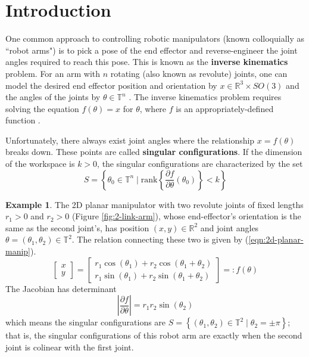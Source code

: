 \documentclass[12pt]{article}
\theoremstyle{definition}
\newtheorem{example}{Example}
\begin{document}
    
\section{Introduction}
One common approach to controlling robotic manipulators 
(known colloquially as ``robot arms") is to pick a pose of the end effector and
reverse-engineer the joint angles required to reach this pose. This is known as
the \textbf{inverse kinematics} problem. For an arm with \(n\) rotating 
(also known as revolute) joints, one can model the desired end effector position
and orientation by \(x \in \mathbb{R}^3 \times SO(3)\) and the angles of the
joints by \(\theta \in \mathbb{T}^n\) \cite{robots-fiber-bundles}. 
The inverse kinematics problem requires solving the
equation \(f(\theta) = x\) for \(\theta\), where \(f\) is an 
appropriately-defined function \cite{program-kin-red-manips}.

Unfortunately, there always exist joint angles where the relationship 
\(x = f(\theta)\) breaks down. These points are called 
\textbf{singular configurations}. If the dimension of the workspace is 
\(k > 0\), the singular configurations are characterized by the set
\[
    S = \left\{ \theta_0 \in \mathbb{T}^n \mid 
    \text{rank}\left\{
        \frac{\partial f}{\partial\theta}(\theta_0) 
    \right\} < k \right\}
\]

\begin{example}
    The 2D planar manipulator with two revolute joints of fixed lengths \(r_1 > 0\)
    and \(r_2 > 0\) (Figure \ref{fig:2-link-arm}), whose end-effector's orientation is the same
    as the second joint's, has position \((x,y) \in \mathbb{R}^2\) and joint angles 
    \(\theta = (\theta_1,\theta_2) \in \mathbb{T}^2\). 
    The relation connecting these two is given by (\ref{eqn:2d-planar-manip}).
    \begin{equation}\label{eqn:2d-planar-manip}
        \begin{bmatrix}x \\ y \end{bmatrix}
        = \begin{bmatrix} 
            r_1\cos(\theta_1) + r_2\cos(\theta_1 + \theta_2) \\
            r_1\sin(\theta_1) + r_2\sin(\theta_1 + \theta_2)
        \end{bmatrix} =: f(\theta)
    \end{equation}
    The Jacobian has determinant
    \[
        \left| \frac{\partial f}{\partial \theta} \right| = r_1r_2\sin(\theta_2)
    \]
    which means the singular configurations are 
    \(S = \left\{ (\theta_1,\theta_2) \in \mathbb{T}^2 \mid \theta_2 = \pm\pi\right\}\); 
    that is, the singular configurations of this robot arm are exactly when the
    second joint is colinear with the first joint.
\end{example}
\end{document}

